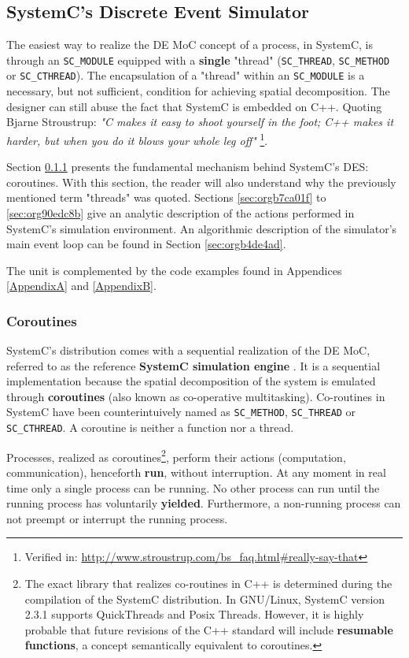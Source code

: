 \documentclass[11pt]{article}
\begin{document}
\clearpage

\subsection{SystemC's Discrete Event Simulator}
\label{sec:org5e2baa4}
The easiest way to realize the DE MoC concept of a process, in SystemC, is through an \texttt{SC\_MODULE} equipped with a \textbf{single} "thread" (\texttt{SC\_THREAD}, \texttt{SC\_METHOD} or \texttt{SC\_CTHREAD}). 
The encapsulation of a "thread" within an \texttt{SC\_MODULE} is a necessary, but not sufficient, condition for achieving spatial decomposition.
The designer can still abuse the fact that SystemC is embedded on C++.
Quoting Bjarne Stroustrup: \textit{"C makes it easy to shoot yourself in the foot; C++ makes it harder, but when you do it blows your whole leg off"} \footnote{Verified in: \url{http://www.stroustrup.com/bs\_faq.html\#really-say-that}}.

Section \ref{sec:org555c3f4} presents the fundamental mechanism behind SystemC's DES: coroutines.
With this section, the reader will also understand why the previously mentioned term "threads" was quoted.
Sections \ref{sec:orgb7ca01f} to \ref{sec:org90edc8b} give an analytic description of the actions performed in SystemC's simulation environment.
An algorithmic description of the simulator's main event loop can be found in Section \ref{sec:orgb4de4ad}.

The unit is complemented by the code examples found in Appendices \ref{AppendixA} and \ref{AppendixB}.

\subsubsection{Coroutines}
\label{sec:org555c3f4}
SystemC's distribution comes with a sequential realization of the DE MoC, referred to as the reference \textbf{SystemC simulation engine} \cite{OpenSystemCInitiative2012}.
It is a sequential implementation because the spatial decomposition of the system is emulated through \textbf{coroutines} (also known as co-operative multitasking). 
Co-routines in SystemC have been counterintuively named as \texttt{SC\_METHOD}, \texttt{SC\_THREAD} or \texttt{SC\_CTHREAD}.
A coroutine is neither a function nor a thread.

Processes, realized as coroutines\footnote{The exact library that realizes co-routines in C++ is determined during the compilation of the SystemC distribution. 
In GNU/Linux, SystemC version 2.3.1 supports QuickThreads and Posix Threads.
However, it is highly probable that future revisions of the C++ standard will include \textbf{resumable functions}, a concept semantically equivalent to coroutines.}, perform their actions (computation, communication), henceforth \textbf{run}, without interruption.
At any moment in real time only a single process can be running.
No other process can run until the running process has voluntarily \textbf{yielded}.
Furthermore, a non-running process can not preempt or interrupt the running process.
\end{document}
